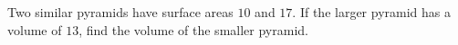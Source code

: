 Two similar pyramids have surface areas $10$ and $17$. If the larger pyramid has a volume of $13$, find the volume of the smaller pyramid.
